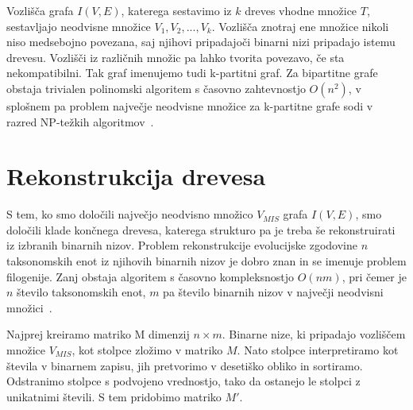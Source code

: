 \documentclass[a4paper, 12pt]{book}
\begin{document}
Vozlišča grafa $I(V, E)$, katerega sestavimo iz $k$ dreves vhodne množice $T$, 
sestavljajo neodvisne množice $V_1, V_2, ..., V_k$. Vozlišča znotraj ene množice
nikoli niso medsebojno povezana, saj njihovi pripadajoči binarni nizi pripadajo 
istemu drevesu. Vozlišči iz različnih množic pa lahko tvorita povezavo, če
sta nekompatibilni. Tak graf imenujemo tudi k-partitni graf. Za bipartitne grafe 
obstaja trivialen polinomski algoritem s časovno zahtevnostjo $O(n^2)$, v splošnem 
pa problem največje neodvisne množice za k-partitne grafe sodi v razred 
NP-težkih algoritmov~\cite{pw}. 

\section{Rekonstrukcija drevesa}
S tem, ko smo določili največjo neodvisno množico $V_{MIS}$ grafa $I(V, E)$, 
smo določili klade končnega drevesa, katerega strukturo pa je treba še 
rekonstruirati iz izbranih binarnih nizov. Problem rekonstrukcije evolucijske 
zgodovine $n$ taksonomskih enot iz njihovih binarnih nizov je dobro znan in se 
imenuje problem filogenije. Zanj obstaja algoritem s časovno kompleksnostjo $O(nm)$, 
pri čemer je $n$ število taksonomskih enot, $m$ pa število binarnih nizov v največji
 neodvisni množici~\cite{gd}.

Najprej kreiramo matriko M dimenzij $n×m$. Binarne nize, ki pripadajo vozliščem 
množice $V_{MIS}$, kot stolpce zložimo v matriko $M$. Nato stolpce interpretiramo 
kot števila v binarnem zapisu, jih pretvorimo v desetiško obliko in sortiramo. 
Odstranimo stolpce s podvojeno vrednostjo, tako da ostanejo le stolpci z unikatnimi 
števili. S tem pridobimo matriko $M'$.
\end{document}
